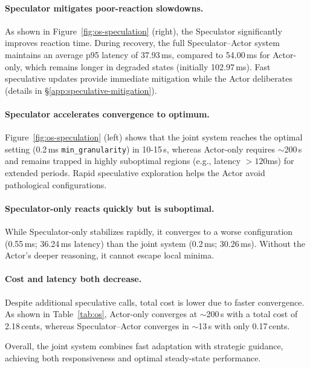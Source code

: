 

\paragraph{Speculator mitigates poor-reaction slowdowns.}
As shown in Figure~\ref{fig:os-speculation} (right), the Speculator significantly improves reaction time. 
During recovery, the full Speculator–Actor system maintains an average p95 latency of 37.93\,ms, compared to 54.00\,ms for Actor-only, which remains longer in degraded states (initially 102.97\,ms). 
Fast speculative updates provide immediate mitigation while the Actor deliberates (details in \S\ref{app:speculative-mitigation}).

\vspace{-5pt}
\paragraph{Speculator accelerates convergence to optimum.}
Figure~\ref{fig:os-speculation} (left) shows that the joint system reaches the optimal setting (0.2\,ms \texttt{min\_granularity}) in 10-15\,s, whereas Actor-only requires $\sim$200\,s and remains trapped in highly suboptimal regions (e.g., latency $>120$ms) for extended periods. 
Rapid speculative exploration helps the Actor avoid pathological configurations.

\paragraph{Speculator-only reacts quickly but is suboptimal.}
While Speculator-only stabilizes rapidly, it converges to a worse configuration (0.55\,ms; 36.24\,ms latency) than the joint system (0.2\,ms; 30.26\,ms). 
Without the Actor’s deeper reasoning, it cannot escape local minima.

\paragraph{Cost and latency both decrease.}
Despite additional speculative calls, total cost is lower due to faster convergence. 
As shown in Table~\ref{tab:os}, Actor-only converges at $\sim$200\,s with a total cost of 2.18\,cents, whereas Speculator–Actor converges in $\sim$13\,s with only 0.17\,cents.

Overall, the joint system combines fast adaptation with strategic guidance, achieving both responsiveness and optimal steady-state performance.